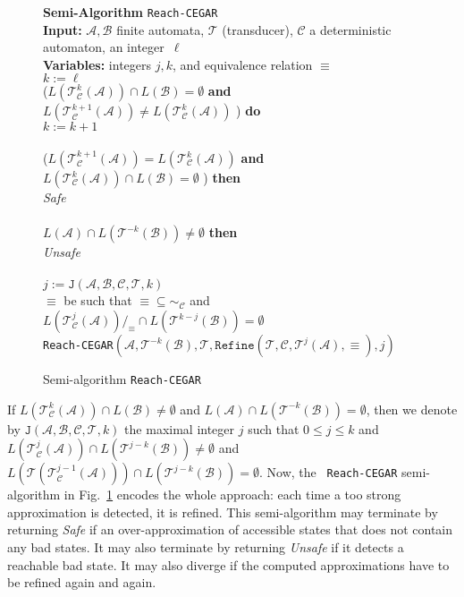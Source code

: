 \documentclass[]{llncs}
\def \sp {\hspace*{0.8cm}}
\def \A {\mathcal{A}}
\def \T {\mathcal{T}}
\def \B {\mathcal{B}}
\def \C {\mathcal{C}}
\begin{document}
\begin{figure}[tb]
{\bf Semi-Algorithm} {\tt Reach-CEGAR}\\
{\bf Input:} $\A,\B$  finite automata, $\T$ (transducer), $\C$ a
deterministic automaton, an integer~$\ell$\\
{\bf Variables:} integers $j,k$, and equivalence relation $\equiv$\\
\sp $k:=\ell$\\
\sp {\bf While} ($L(\T_\C^k(\A))\cap L(\B)= \emptyset$ {\bf and}
$L(\T_\C^{k+1}(\A))\neq L(\T_\C^k(\A))$ ) {\bf do}\\
\sp\sp $k:=k+1$\\
\sp {\bf EndWhile}\\
\sp {\bf If} ($L(\T_\C^{k+1}(\A))=L(\T_\C^k(\A))$ {\bf and} $L(\T_\C^k(\A))\cap L(\B)= \emptyset$ ) {\bf then}\\
\sp\sp {\bf Return} {\it Safe}\\
\sp {\bf EndIf}\\
\sp {\bf If}  $L(\A)\cap L(\T^{-k}(\B)) \neq \emptyset$ {\bf then}\\
\sp\sp {\bf Return} {\it Unsafe}\\
\sp{\bf EndIf}\\
\sp $j:=\mathtt{J}(\A,\B,\C,\T,k)$\\
\sp {\bf Let} $\equiv$ be such that $\equiv\subseteq \sim_{\C}$ and 
$L(\T^{j}_\C(\A))/_\equiv\cap L(\T^{k-j}(\B))=\emptyset$\\
\sp {\bf Return}  {\tt Reach-CEGAR}$(\A,\T^{-k}(\B),\T,\mathtt{Refine}(\T,\C,\T^j(\A),\equiv),j)$
\caption{Semi-algorithm {\tt Reach-CEGAR}}\label{algo:cegar}
\end{figure}

If $L(\T^{k}_\C(\A))\cap L(\B)\neq\emptyset$ and $L(\A)\cap
L(\T^{-k}(\B))=\emptyset$, then we denote by
$\mathtt{J}(\A,\B,\C,\T,k)$ the maximal integer $j$ such that $0\leq
j\leq k$ and $L(\T^{j}_\C(\A))\cap L(\T^{j-k}(\B))\neq\emptyset$ and
$L(\T(\T^{j-1}_\C(\A)))\cap L(\T^{j-k}(\B))=\emptyset$. Now, the {\tt
  Reach-CEGAR} semi-algorithm in Fig.~\ref{algo:cegar}
encodes the whole approach: each time a too strong approximation is
detected, it is refined. This semi-algorithm may terminate by
returning {\it Safe} if an over-approximation of accessible states
that does not contain any bad states. It may also
terminate by returning {\it Unsafe} if it detects a reachable bad state. 
It may also diverge if the computed approximations have to
be refined again and again.
\end{document}

